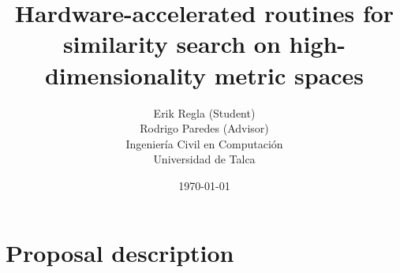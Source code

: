 \documentclass[11pt,letterpaper]{article}
\begin{document}
\pagestyle{empty}

\title{
    Hardware-accelerated routines for similarity search on high-dimensionality metric spaces
}
\author{
Erik Regla (Student)\\
Rodrigo Paredes (Advisor)\\
Ingeniería Civil en Computación\\ 
Universidad de Talca}
\date{\today}
\maketitle


\section{Proposal description}
\end{document}
